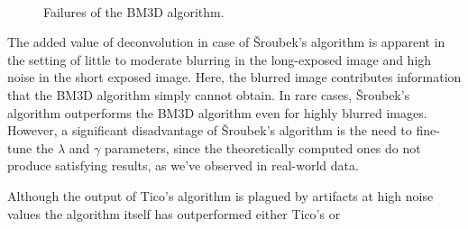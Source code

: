 \documentclass[12pt,notitlepage]{report}
\begin{document}
\begin{figure}[htb]
	  ~
	  ~
  \caption[Failures of the BM3D algorithm.]{Failures of the BM3D algorithm.}
  \label{fig:bm3d_failure}
\end{figure}



The added value of deconvolution in case of Šroubek's algorithm is apparent in the setting of little to moderate blurring in the long-exposed image and high noise in the short exposed image. Here, the blurred image contributes information that the BM3D algorithm simply cannot obtain. In rare cases, Šroubek's algorithm outperforms the BM3D algorithm even for highly blurred images. However, a significant disadvantage of Šroubek's algorithm is the need to fine-tune the $\lambda$ and $\gamma$ parameters, since the theoretically computed ones do not produce satisfying results, as we've observed in real-world data.



Although the output of Tico's algorithm is plagued by artifacts at high noise values the algorithm itself has outperformed either Tico's or      
\end{document}
